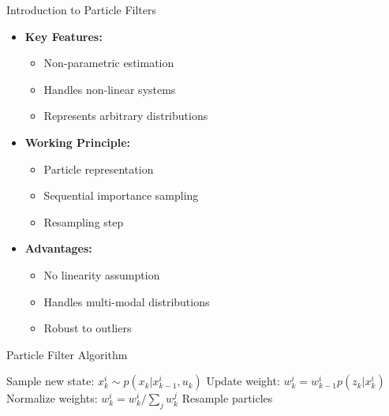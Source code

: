\documentclass[aspectratio=169]{beamer}
\begin{document}
\begin{frame}{Introduction to Particle Filters}
    \begin{itemize}
        \item<1-> \textbf{Key Features:}
            \begin{itemize}
                \item Non-parametric estimation
                \item Handles non-linear systems
                \item Represents arbitrary distributions
            \end{itemize}
        \item<2-> \textbf{Working Principle:}
            \begin{itemize}
                \item Particle representation
                \item Sequential importance sampling
                \item Resampling step
            \end{itemize}
        \item<3-> \textbf{Advantages:}
            \begin{itemize}
                \item No linearity assumption
                \item Handles multi-modal distributions
                \item Robust to outliers
            \end{itemize}
    \end{itemize}
\end{frame}

\begin{frame}{Particle Filter Algorithm}
    \begin{algorithm}[H]
    \begin{algorithmic}[1]
                \State Sample new state: $x_k^i \sim p(x_k|x_{k-1}^i, u_k)$
                \State Update weight: $w_k^i = w_{k-1}^i p(z_k|x_k^i)$
            \EndFor
            \State Normalize weights: $w_k^i = w_k^i/\sum_j w_k^j$
                \State Resample particles
            \EndIf
        \EndFor
    \end{algorithmic}
    \end{algorithm}
\end{frame}
\end{document}
